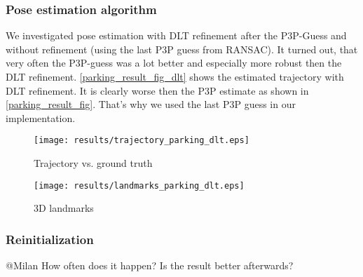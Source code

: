 \subsubsection{Pose estimation algorithm}
We investigated pose estimation with DLT refinement after the P3P-Guess and without refinement (using the last P3P guess from RANSAC). It turned out, that very often the P3P-guess was a lot better and especially more robust then the DLT refinement. \cref{parking_result_fig_dlt} shows the estimated trajectory with DLT refinement. It is clearly worse then the P3P estimate as shown in \cref{parking_result_fig}. That's why we used the last P3P guess in our implementation.
\begin{figure*}[ht!]
    \centering
    \begin{subfigure}[t]{0.5\textwidth}
        \centering
        \texttt{[image: results/trajectory\_parking\_dlt.eps]} 
        \caption{Trajectory vs. ground truth}
    \end{subfigure} 
    \begin{subfigure}[t]{0.5\textwidth}
        \centering
        \texttt{[image: results/landmarks\_parking\_dlt.eps]}
        \caption{3D landmarks}
    \end{subfigure}
    \caption{Parking dataset results with DLT refinement}
		\label{parking_result_fig_dlt}
\end{figure*}

\subsubsection{Reinitialization}
\textcolor[rgb]{1,0,0}{@Milan}
How often does it happen? Is the result better afterwards?
